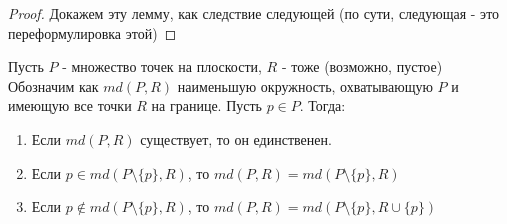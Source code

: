 \documentclass[11pt]{article}
\begin{document}
\begin{proof}
Докажем эту лемму, как следствие следующей (по сути, следующая - это переформулировка
этой)
\end{proof}

\begin{lemma}
Пусть \(P\) - множество точек на плоскости, \(R\) - тоже (возможно, пустое)
Обозначим как \(md(P, R)\) наименьшую окружность, охватывающую \(P\) и имеющую все точки \(R\) на границе.
Пусть \(p \in P\). Тогда:
\begin{enumerate}
\item Если \(md(P, R)\) существует, то он единственен.
\item Если \(p \in md(P \setminus \{p\}, R)\), то \(md(P, R) = md(P \setminus \{p\}, R)\)
\item Если \(p \notin md(P \setminus \{p\}, R)\), то \(md(P, R) = md(P \setminus \{p\}, R \cup \{p\})\)
\end{enumerate}
\end{lemma}
\end{document}
